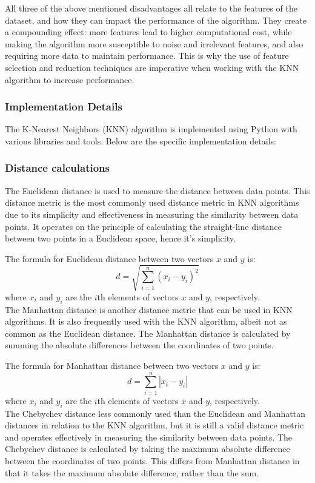 All three of the above mentioned disadvantages all relate to the features of the dataset, and how they can impact the performance of the algorithm.
They create a compounding effect: more features lead to higher computational cost, while making the algorithm more susceptible to noise and irrelevant features,
and also requiring more data to maintain performance. This is why the use of feature selection and reduction techniques are imperative 
when working with the KNN algorithm to increase performance.


\subsubsection{Implementation Details}
The K-Nearest Neighbors (KNN) algorithm is implemented using Python with various libraries and tools.
Below are the specific implementation details:

\subsubsection*{Distance calculations}
The Euclidean distance is used to measure the distance between data points. 
This distance metric is the most commonly used distance metric in KNN algorithms
due to its simplicity and effectiveness in measuring the similarity between data points\cite{IBM2023}.
It operates on the principle of calculating the straight-line distance between two points in a Euclidean space, hence it's simplicity.

The formula for Euclidean distance between two vectors \(x\) and \(y\) is:
\[ d = \sqrt{\sum_{i=1}^{n} (x_i - y_i)^2} \]
where \(x_i\) and \(y_i\) are the \(i\)th elements of vectors \(x\) and \(y\), respectively.\\

The Manhattan distance is another distance metric that can be used in KNN algorithms. It is also frequently used with the KNN algorithm,
albeit not as common as the Euclidean distance.
The Manhattan distance is calculated by summing the absolute differences between the coordinates of two points.

The formula for Manhattan distance between two vectors \(x\) and \(y\) is:
\[ d = \sum_{i=1}^{n} |x_i - y_i| \]
where \(x_i\) and \(y_i\) are the \(i\)th elements of vectors \(x\) and \(y\), respectively.\\

The Chebychev distance less commonly used than the Euclidean and Manhattan distances
in relation to the KNN algorithm, but it is still a valid distance metric and operates effectively in measuring the similarity between data points.
The Chebychev distance is calculated by taking the maximum absolute difference between the coordinates of two points. This differs from Manhattan distance
in that it takes the maximum absolute difference, rather than the sum.

